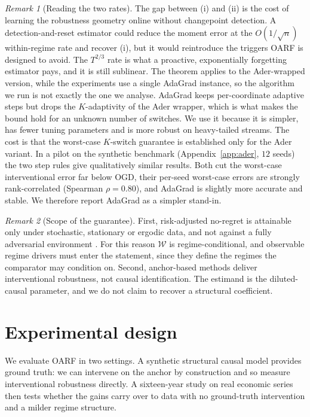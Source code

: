\documentclass[authoryear,preprint,12pt]{elsarticle}
\theoremstyle{plain}
\theoremstyle{remark}
\newtheorem{remark}{Remark}
\newcommand{\OARF}{\textsc{OARF}}
\begin{document}
\begin{remark}[Reading the two rates]\label{rem:rates}
The gap between (i) and (ii) is the cost of learning the robustness geometry online
without changepoint detection. A detection-and-reset estimator could reduce the moment
error at the $O(1/\sqrt{n})$ within-regime rate and recover (i), but it would
reintroduce the triggers \OARF{} is designed to avoid. The $T^{2/3}$ rate is what a
proactive, exponentially forgetting estimator pays, and it is still sublinear. The theorem applies to the Ader-wrapped
version, while the experiments use a single AdaGrad instance, so the algorithm we run
is not exactly the one we analyse. AdaGrad keeps per-coordinate adaptive steps but
drops the $K$-adaptivity of the Ader wrapper, which is what makes the bound hold for
an unknown number of switches. We use it because it is simpler, has fewer tuning
parameters and is more robust on heavy-tailed streams. The cost is that the worst-case
$K$-switch guarantee is established only for the Ader variant. In a pilot on the
synthetic benchmark (Appendix~\ref{app:ader}, $12$ seeds) the two step rules give
qualitatively similar results. Both cut the worst-case interventional error far below
OGD, their per-seed worst-case errors are strongly rank-correlated (Spearman
$\rho=0.80$), and AdaGrad is slightly more accurate and stable. We therefore report
AdaGrad as a simpler stand-in.
\end{remark}

\begin{remark}[Scope of the guarantee]\label{rem:honesty}
First, risk-adjusted no-regret is attainable only under
stochastic, stationary or ergodic data, and not against a fully adversarial
environment \citep{uziel2017growth}. For this reason $\mathcal{W}$ is
regime-conditional, and observable regime drivers must enter the statement, since they
define the regimes the comparator may condition on. Second, anchor-based methods
deliver interventional robustness, not causal identification. The estimand is the
diluted-causal parameter, and we do not claim to recover a structural coefficient.
\end{remark}

\section{Experimental design}\label{sec:setup}

We evaluate \OARF{} in two settings. A synthetic structural causal model provides ground
truth: we can intervene on the anchor by construction and so measure interventional
robustness directly. A sixteen-year study on real economic series then tests whether
the gains carry over to data with no ground-truth intervention and a milder regime
structure. 
\end{document}
